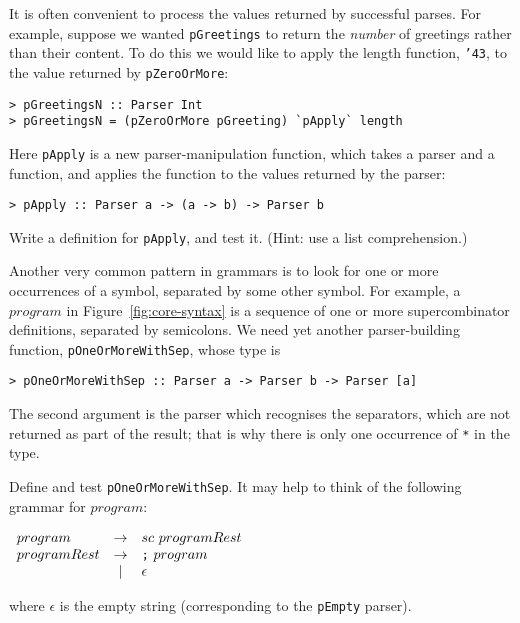 It is often convenient to process the values returned by successful
parses. For example, suppose we wanted \mbox{\tt pGreetings} to return the
{\em number\/} of greetings rather than their content.  To do this we would
like to apply the length function, \mbox{\tt {\char'43}}, to the value returned by
\mbox{\tt pZeroOrMore}:
\begin{verbatim}
> pGreetingsN :: Parser Int
> pGreetingsN = (pZeroOrMore pGreeting) `pApply` length
\end{verbatim}
%
%
Here \mbox{\tt pApply} is a new parser-manipulation function, which takes a parser
and a function, and applies the function to the values returned by the parser:
\begin{verbatim}
> pApply :: Parser a -> (a -> b) -> Parser b
\end{verbatim}
%
\begin{exercise}
Write a definition for \mbox{\tt pApply}, and test it.
(Hint: use a list comprehension.)
\end{exercise}

Another very common pattern in grammars is to look for one or more
occurrences of a symbol, separated by some other symbol.
For example, a $program$ in Figure~\ref{fig:core-syntax} is a sequence
of one or more supercombinator definitions, separated by semicolons.
We need yet another parser-building function, \mbox{\tt pOneOrMoreWithSep}, whose
type is
\begin{verbatim}
> pOneOrMoreWithSep :: Parser a -> Parser b -> Parser [a]
\end{verbatim}
%
\par
The second argument is the parser which recognises the separators, which
are not returned as part of the result; that is why there is only
one occurrence of \mbox{\tt **} in the type.

\begin{exercise}
\label{ex:pSep}
Define and test \mbox{\tt pOneOrMoreWithSep}.  It may help to think of the following
grammar for $program$:
\begin{center}
$\begin{array}{lcl}
program & \rightarrow & sc ~ programRest \\
programRest & \rightarrow & \mbox{\tt ;}~ program \\
        & | & \epsilon
\end{array}$
\end{center}
where $\epsilon$ is the empty string (corresponding to the \mbox{\tt pEmpty} parser).
\end{exercise}

